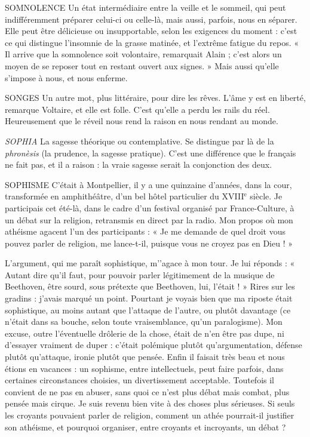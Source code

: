 SOMNOLENCE Un état intermédiaire entre la veille et le sommeil, qui peut
indifféremment préparer celui-ci ou celle-là, mais aussi,
parfois, nous en séparer. Elle peut être délicieuse ou insupportable, selon les
exigences du moment : c’est ce qui distingue l’insomnie de la grasse matinée, et
l'extrême fatigue du repos. « Il arrive que la somnolence soit volontaire, remarquait
Alain ; c’est alors un moyen de se reposer tout en restant ouvert aux
signes. » Mais aussi qu’elle s’impose à nous, et nous enferme.

SONGES Un autre mot, plus littéraire, pour dire les rêves. L'âme y est en
liberté, remarque Voltaire, et elle est folle. C’est qu’elle a perdu les
rails du réel. Heureusement que le réveil nous rend la raison en nous rendant
au monde.

{\it SOPHIA} La sagesse théorique ou contemplative. Se distingue par là de la {\it phronèsis}
(la prudence, la sagesse pratique). C’est une différence que le
français ne fait pas, et il a raison : la vraie sagesse serait la conjonction des deux.

SOPHISME C'était à Montpellier, il y a une quinzaine d’années, dans la
cour, transformée en amphithéâtre, d’un bel hôtel particulier
du {\footnotesize XVIII$^\text{e}$} siècle. Je participais cet été-là, dans le cadre d’un festival organisé par
France-Culture, à un débat sur la religion, retransmis en direct par la radio.
Mon propos où mon athéisme agacent l’un des participants : « Je me demande
de quel droit vous pouvez parler de religion, me lance-t-il, puisque vous ne
croyez pas en Dieu ! »

L’argument, qui me paraît sophistique, m'’agace à mon tour. Je lui
réponds : « Autant dire qu’il faut, pour pouvoir parler légitimement de la
musique de Beethoven, être sourd, sous prétexte que Beethoven, lui, l’était ! »
Rires sur les gradins : j’avais marqué un point. Pourtant je voyais bien que ma
riposte était sophistique, au moins autant que l'attaque de l’autre, ou plutôt
davantage (ce n’était dans sa bouche, selon toute vraisemblance, qu’un paralogisme).
Mon excuse, outre l’éventuelle drôlerie de la chose, était de n’en être
pas dupe, ni d’essayer vraiment de duper : c'était polémique plutôt qu’argumentation,
défense plutôt qu’attaque, ironie plutôt que pensée. Enfin il faisait
très beau et nous étions en vacances : un sophisme, entre intellectuels, peut
faire parfois, dans certaines circonstances choisies, un divertissement acceptable.
Toutefois il convient de ne pas en abuser, sans quoi ce n’est plus débat
mais combat, plus pensée mais cirque. Je suis revenu bien vite à des choses plus
sérieuses. Si seuls les croyants pouvaient parler de religion, comment un athée
pourrait-il justifier son athéisme, et pourquoi organiser, entre croyants et
incroyants, un débat ?

